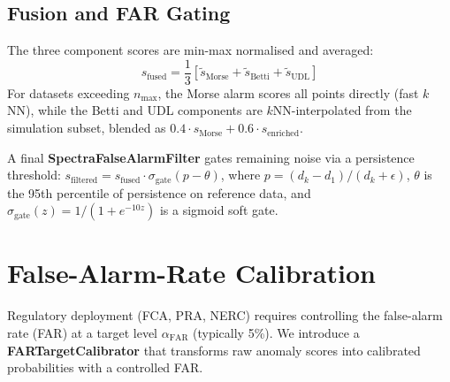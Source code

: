 \documentclass{article}
\begin{document}
\subsection{Fusion and FAR Gating}

The three component scores are min-max normalised and averaged:
\begin{equation}
s_{\text{fused}} = \frac{1}{3}\left[\tilde{s}_{\text{Morse}} + \tilde{s}_{\text{Betti}} + \tilde{s}_{\text{UDL}}\right]
\label{eq:fused}
\end{equation}
For datasets exceeding $n_{\max}$, the Morse alarm scores all points directly (fast $k$NN), while the Betti and UDL components are $k$NN-interpolated from the simulation subset, blended as $0.4 \cdot s_{\text{Morse}} + 0.6 \cdot s_{\text{enriched}}$.

A final \textbf{SpectraFalseAlarmFilter} gates remaining noise via a persistence threshold: $s_{\text{filtered}} = s_{\text{fused}} \cdot \sigma_{\text{gate}}(p - \theta)$, where $p = (d_k - d_1)/(d_k + \epsilon)$, $\theta$ is the 95th percentile of persistence on reference data, and $\sigma_{\text{gate}}(z) = 1/(1 + e^{-10z})$ is a sigmoid soft gate.

\section{False-Alarm-Rate Calibration}
\label{sec:far_calibration}

Regulatory deployment (FCA, PRA, NERC) requires controlling the false-alarm rate (FAR) at a target level $\alpha_{\text{FAR}}$ (typically 5\%). We introduce a \textbf{FARTargetCalibrator} that transforms raw anomaly scores into calibrated probabilities with a controlled FAR.
\end{document}
